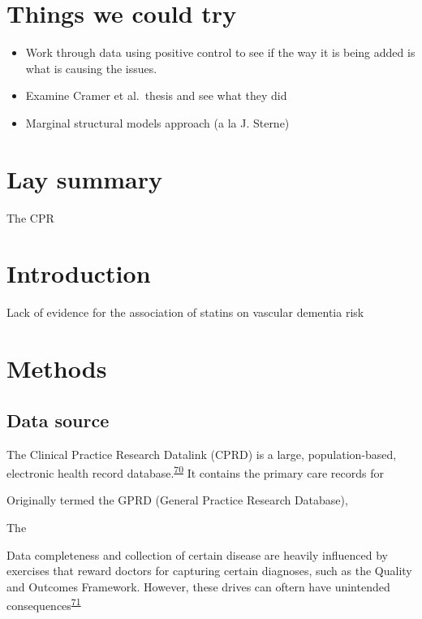 \documentclass[a4paper, twoside]{templates/ociamthesis}
\providecommand{\tightlist}{%
  \setlength{\itemsep}{0pt}\setlength{\parskip}{0pt}}
\begin{document}
\hypertarget{things-we-could-try}{%
\section{Things we could try}\label{things-we-could-try}}

\begin{itemize}
\tightlist
\item
  Work through data using positive control to see if the way it is being added is what is causing the issues.
\item
  Examine Cramer et al.~thesis and see what they did
\item
  Marginal structural models approach (a la J. Sterne)
\end{itemize}

\hypertarget{lay-summary-2}{%
\section{Lay summary}\label{lay-summary-2}}

The CPR

\hypertarget{introduction-2}{%
\section{Introduction}\label{introduction-2}}

Lack of evidence for the association of statins on vascular dementia risk

\hypertarget{methods-1}{%
\section{Methods}\label{methods-1}}

\hypertarget{data-source}{%
\subsection{Data source}\label{data-source}}

The Clinical Practice Research Datalink (CPRD) is a large, population-based, electronic health record database.\textsuperscript{\protect\hyperlink{ref-herrett2015}{70}} It contains the primary care records for

Originally termed the GPRD (General Practice Research Database),

The

Data completeness and collection of certain disease are heavily influenced by exercises that reward doctors for capturing certain diagnoses, such as the Quality and Outcomes Framework. However, these drives can oftern have unintended consequences\textsuperscript{\protect\hyperlink{ref-liu2019}{71}}
\end{document}

